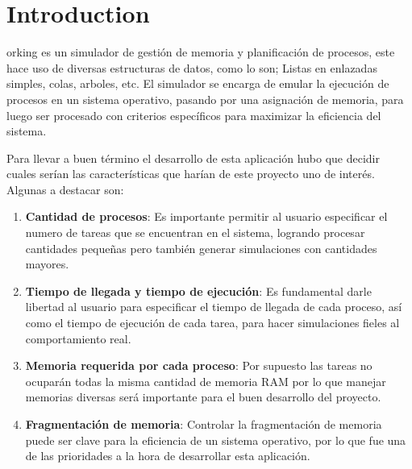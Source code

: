 \section{Introduction}

orking es un simulador de gestión de memoria y planificación de procesos, este hace uso de diversas estructuras de datos, como lo son; Listas en enlazadas simples, colas, arboles, etc. El simulador se encarga de emular la ejecución de procesos en un sistema operativo, pasando por una asignación de memoria, para luego ser procesado con criterios específicos para maximizar la eficiencia del sistema.

Para llevar a buen término el desarrollo de esta aplicación hubo que decidir cuales serían las características que harían de este proyecto uno de interés. Algunas a destacar son:
\begin{enumerate}
    \item \textbf{Cantidad de procesos}: Es importante permitir al usuario especificar el numero de tareas que se encuentran en el sistema, logrando procesar cantidades pequeñas pero también generar simulaciones con cantidades mayores.
    \item \textbf{Tiempo de llegada y tiempo de ejecución}: Es fundamental darle libertad al usuario para especificar el tiempo de llegada de cada proceso, así como el tiempo de ejecución de cada tarea, para hacer simulaciones fieles al comportamiento real.
    \item \textbf{Memoria requerida por cada proceso}: Por supuesto las tareas no ocuparán todas la misma cantidad de memoria RAM por lo que manejar memorias diversas será importante para el buen desarrollo del proyecto.
    \item \textbf{Fragmentación de memoria}: Controlar la fragmentación de memoria puede ser clave para la eficiencia de un sistema operativo, por lo que fue una de las prioridades a la hora de desarrollar esta aplicación.
\end{enumerate}

